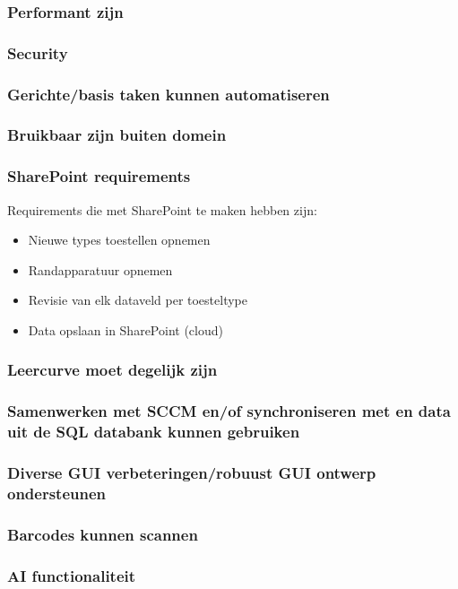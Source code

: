 \subsubsection{Performant zijn}
\subsubsection{Security}
\subsubsection{Gerichte/basis taken kunnen automatiseren}
\subsubsection{Bruikbaar zijn buiten domein}
\subsubsection{SharePoint requirements}

Requirements die met SharePoint te maken hebben zijn:
\begin{itemize}
    \item Nieuwe types toestellen opnemen
    \item Randapparatuur opnemen
    \item Revisie van elk dataveld per toesteltype
    \item Data opslaan in SharePoint (cloud)
\end{itemize}

\subsubsection{Leercurve moet degelijk zijn}
\subsubsection{Samenwerken met SCCM en/of synchroniseren met en data uit de SQL databank kunnen gebruiken}
\subsubsection{Diverse GUI verbeteringen/robuust GUI ontwerp ondersteunen}
\subsubsection{Barcodes kunnen scannen}
\subsubsection{AI functionaliteit}